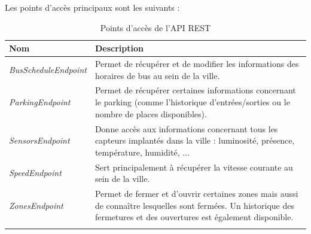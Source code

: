 Les points d’accès principaux sont les suivants :
\begin{center}
{\renewcommand{\arraystretch}{1.5}
\begin{longtable}{| p{} | p{} |}
    \hline
    \textbf{Nom} & \textbf{Description}\\
    \hline
    \emph{BusScheduleEndpoint} & Permet de récupérer et de modifier les informations des horaires de bus au sein de la ville.\\
    \hline
    \emph{ParkingEndpoint} & Permet de récupérer certaines informations concernant le parking (comme l’historique d’entrées/sorties ou le nombre de places disponibles).\\
    \hline
    \emph{SensorsEndpoint} & Donne accès aux informations concernant tous les capteurs implantés dans la ville : luminosité, présence, température, humidité, ...\\
    \hline
    \emph{SpeedEndpoint} & Sert principalement à récupérer la vitesse courante au sein de la ville.\\
    \hline
    \emph{ZonesEndpoint} & Permet de fermer et d’ouvrir certaines zones mais aussi de connaître lesquelles sont fermées. Un historique des fermetures et des ouvertures est également disponible.\\
    \hline
    \caption{Points d'accès de l'API REST}
\end{longtable}}
\end{center}
\vspace{-1cm}

